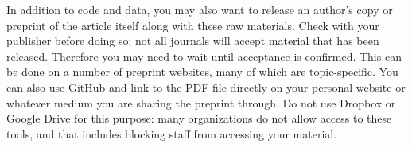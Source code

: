 In addition to code and data,
you may also want to release an author's copy or preprint
of the article itself along with these raw materials.
Check with your publisher before doing so;
not all journals will accept material that has been released.
Therefore you may need to wait until acceptance is confirmed.
This can be done on a number of preprint websites,
many of which are topic-specific.
You can also use GitHub and link to the PDF file directly
on your personal website or whatever medium you are
sharing the preprint through.
Do not use Dropbox or Google Drive for this purpose:
many organizations do not allow access to these tools,
and that includes blocking staff from accessing your material.
